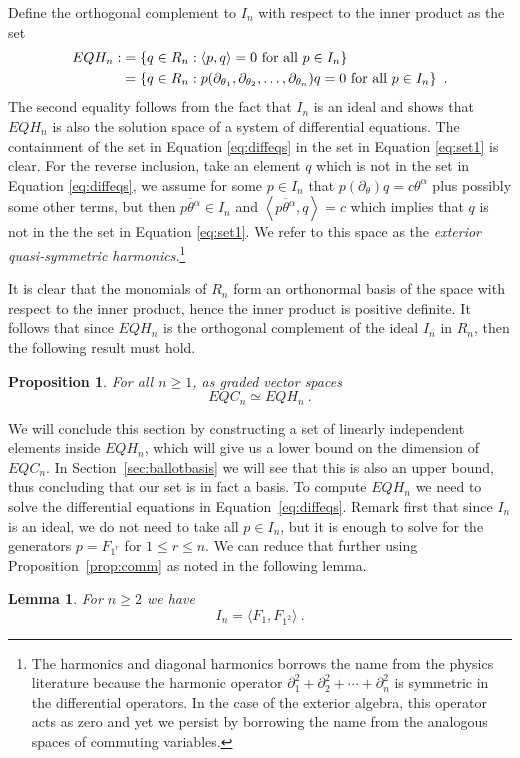 \documentclass[11pt]{amsart}
\newtheorem{prop}[theorem]{Proposition}
\newtheorem{lemma}[theorem]{Lemma}
\theoremstyle{definition}
\numberwithin{equation}{section}
\newcommand{\mike}[1]{\todo[size=\tiny,color=lime!30]{#1 \\ \hfill --- Mike}}
\begin{document}
Define the orthogonal complement to $I_n$ with respect to the inner product as
the set
\begin{align}
EQH_n :&= \left\{ q \in R_n : \left< p, q \right> = 0 \hbox{ for all } p \in I_n \right\}
\label{eq:set1}\\
  &=\left\{ q \in R_n : p(\partial_{\theta_1}, \partial_{\theta_2}, \ldots, \partial_{\theta_n})
q= 0 \hbox{ for all } p \in I_n \right\}~.\label{eq:diffeqs}
\end{align}
The second equality follows from the fact that $I_n$ is an ideal
and shows that $EQH_n$ is also the solution space of
a system of differential equations.  The containment of the set
in Equation \eqref{eq:diffeqs} in the set in Equation \eqref{eq:set1} is clear.
For the reverse inclusion, take an element $q$ which is not in the
set in Equation \eqref{eq:diffeqs}, we assume
for some $p \in I_n$ that $p(\partial_\theta) q = c \theta^\alpha$ plus possibly some other terms,
but then $\overline{p \theta^\alpha} \in I_n$
and $\left< \overline{p \theta^\alpha}, q \right> = c$ which implies that $q$ is not in the
the set in Equation \eqref{eq:set1}.
We refer to this space as the \emph{exterior quasi-symmetric harmonics}.\footnote{
The harmonics and diagonal harmonics borrows the name from the physics literature
because the harmonic operator $\partial_1^2 + \partial_2^2 + \cdots + \partial_n^2$
is symmetric in the differential operators.  In the case of the exterior algebra,
this operator acts as zero and yet we persist by borrowing the name from the
analogous spaces of commuting variables.
}

It is clear that the monomials of $R_n$ form an orthonormal basis of the space
with respect to the inner product, hence the inner product is positive definite.
It follows that since $EQH_n$ is the orthogonal complement of the ideal $I_n$ in $R_n$,
then the following result must hold.
\begin{prop} For all $n \geq 1$, as graded vector spaces
\[
EQC_n \simeq EQH_n~.
\]
\end{prop}

We will conclude this section  by constructing a set of linearly independent elements inside $EQH_n$, which will
give us a lower  bound on the dimension of $EQC_n$. In Section~\ref{sec:ballotbasis} we will see that this is also an upper bound,
thus concluding that our  set is in fact a basis. To compute $EQH_n$ we need to solve the differential equations in Equation~\eqref{eq:diffeqs}.
Remark first  that since $I_n$ is an ideal, we do not need to take all $p\in I_n$, but it is enough to solve for the generators $p=F_{1^r}$ for  $1\le r\le n$.
We can reduce that further using Proposition~\ref{prop:comm} as noted in the following lemma.
\begin{lemma}\label{lem:idealgen}
For $n\ge 2$ we have
\[
I_n=\langle F_1, F_{1^2}  \rangle~.
\]
\end{lemma}
\end{document}
